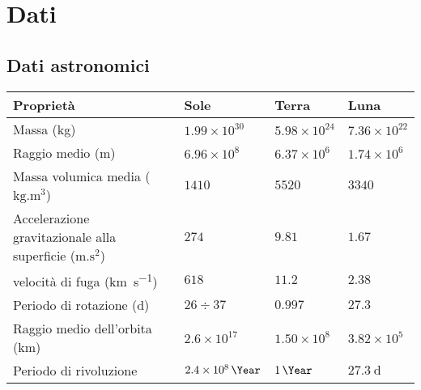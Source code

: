 \chapter{Dati}
\section{Dati astronomici}
\begin{small}
    \begin{tabular}{p{}lll}
        \hline
        Proprietà                                                                    & Sole                 & Terra             & Luna   \\
        \hline Massa (\si{\kilogram})                                                & $1.99\times 10^{30}$ &
        $5.98\times 10^{24}$                                                         & $7.36\times
        10^{22}$                                                                                                                         \\
        Raggio medio (\si{\meter})                                                   & $6.96\times 10^8$    & $6.37\times
        10^6$                                                                        & $1.74\times
        10^6$                                                                                                                            \\
        Massa volumica media ($\si{\kilogram.\meter^3}$)                             & $1410$               & $5520$            & $3340$ \\
        Accelerazione gravitazionale alla superficie ($\si{\meter.\second\squared}$) & $274$                & $9.81$            & $1.67$ \\
        velocità di fuga (\si{\kilo\meter\per\second})                               & $618$                & $11.2$            & $2.38$ \\
        Periodo di rotazione (\si{\day})                                             & $26\div37$           & $0.997$           & $27.3$ \\
        Raggio medio dell'orbita (\si{\kilo\meter})                                  & $2.6\times
        10^{17}$                                                                     & $1.50\times 10^8$    & $3.82\times 10^5$          \\
        Periodo di rivoluzione                                                       & $\SI{2.4E8}{\Year}$  &
        $\SI{1}{\Year}$                                                              & $\SI{27.3}{\day}$                                 \\
        \hline
    \end{tabular}
\end{small}
